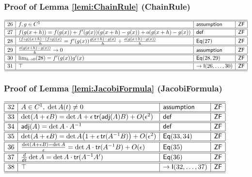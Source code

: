 \documentclass[11pt,reqno]{amsart}
\begin{document}
\medskip

\subsubsection*{Proof of Lemma \ref{lemi:ChainRule} (\textsf{ChainRule})}

\noindent$%
\begin{array}{|r|l|l|l|}
\hline\hline
26 & f,g\in C^{1} & \mathsf{assumption} & \mathsf{ZF} \\ \hline\hline
27 & f(g(x+h))=f(g(x))+f^{\prime}(g(x))(g(x+h)-g(x))+o(g(x+h)-g(x)) & \mathsf{def} & \mathsf{ZF} \\ \hline\hline
28 & \frac{(f\circ g)(x+h)-(f\circ g)(x)}{h}=f^{\prime}(g(x))\frac{g(x+h)-g(x)}{h}+\frac{o(g(x+h)-g(x))}{h} & \mathsf{Eq}(27) & \mathsf{ZF} \\ \hline\hline
29 & \frac{o(g(x+h)-g(x))}{h}\to0 & \mathsf{assumption} & \mathsf{ZF} \\ \hline\hline
30 & \lim_{h\to0}(28)=f^{\prime}(g(x))g^{\prime}(x) & \mathsf{Eq}(28,29) & \mathsf{ZF} \\ \hline\hline
31 & \top & \to\mathsf{I}(26,\dots,30) & \mathsf{ZF} \\ \hline\hline
\end{array}%
$

\medskip

\subsubsection*{Proof of Lemma \ref{lemi:JacobiFormula} (\textsf{JacobiFormula})}

\noindent$%
\begin{array}{|r|l|l|l|}
\hline\hline
32 & A\in C^{1},\;\det A(t)\neq0 & \mathsf{assumption} & \mathsf{ZF} \\ \hline\hline
33 & \det(A+\epsilon B)=\det A+\epsilon\,\mathsf{tr}(\mathsf{adj}(A)B)+O(\epsilon^{2}) & \mathsf{def} & \mathsf{ZF} \\ \hline\hline
34 & \mathsf{adj}(A)=\det A\cdot A^{-1} & \mathsf{def} & \mathsf{ZF} \\ \hline\hline
35 & \det(A+\epsilon B)=\det A\bigl(1+\epsilon\,\mathsf{tr}(A^{-1}B)\bigr)+O(\epsilon^{2}) & \mathsf{Eq}(33,34) & \mathsf{ZF} \\ \hline\hline
36 & \frac{\det(A+\epsilon B)-\det A}{\epsilon}=\det A\cdot\mathsf{tr}(A^{-1}B)+O(\epsilon) & \mathsf{Eq}(35) & \mathsf{ZF} \\ \hline\hline
37 & \tfrac{d}{dt}\det A=\det A\cdot\mathsf{tr}(A^{-1}A^{\prime}) & \mathsf{Eq}(36) & \mathsf{ZF} \\ \hline\hline
38 & \top & \to\mathsf{I}(32,\dots,37) & \mathsf{ZF} \\ \hline\hline
\end{array}%
$
\end{document}
